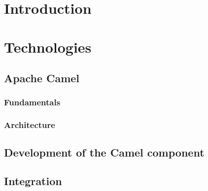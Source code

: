 \documentclass[12pt,final,oneside]{fithesis2}
\begin{document}
\FrontMatter
\ThesisTitlePage

\begin{ThesisDeclaration}
  \DeclarationText
  \AdvisorName
\end{ThesisDeclaration}

\begin{ThesisThanks}
 
\end{ThesisThanks}

\begin{ThesisAbstract}

\end{ThesisAbstract}

\begin{ThesisKeyWords}

\end{ThesisKeyWords}

\MainMatter

\tableofcontents

\chapter{Introduction}


\chapter{Technologies}
\section{Apache Camel}
\subsection{Fundamentals}
\subsection{Architecture}
\section{Development of the Camel component}
\section{Integration}
\end{document}
